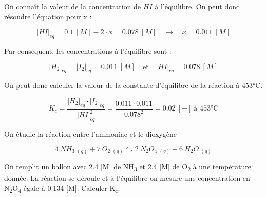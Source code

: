 \documentclass[
  11pt,
  a4paper,
  openany]{book}
\begin{document}
On connaît la valeur de la concentration de \(HI\) à l'équilibre. On peut donc résoudre l'équation pour x :

\[
  |HI|_{eq} = 0.1\ [M] - 2 \cdot x = 0.078\ [M] \quad \rightarrow \quad x = 0.011\ [M]
\]

Par conséquent, les concentrations à l'équilibre sont :

\[
  |H_2|_{eq} = |I_2|_{eq} = 0.011\ [M] \quad \text{et} \quad |HI|_{eq} = 0.078\ [M]
\]

On peut donc calculer la valeur de la constante d'équilibre de la réaction à 453°C.

\[
  K_{c} = \frac{|H_2|_{eq} \cdot |I_2|_{eq}}{|HI|_{eq}^2} = \frac{0.011 \cdot 0.011}{0.078^2} = 0.02\ [-]\ \text{à 453°C}
\]

\clearpage

\begin{Exercise}

On étudie la réaction entre l'ammoniac et le dioxygène

\[
  4\ NH_3\ _{(g)} + 7\ O_2\ _{(g)} \leftrightharpoons 2\ N_2O_4\ _{(g)} + 6\ H_2O\ _{(g)}
\]

On remplit un ballon avec 2.4 {[}M{]} de NH\textsubscript{3} et 2.4 {[}M{]} de O\textsubscript{2} à une température donnée. La réaction se déroule et à l'équilibre on mesure une concentration en N\textsubscript{2}O\textsubscript{4} égale à 0.134 {[}M{]}. Calculer K\textsubscript{c}.


\end{Exercise}
\end{document}
